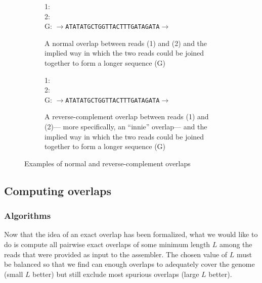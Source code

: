 \documentclass[12pt]{article}
\begin{document}
\begin{figure}
	\centering
	\begin{subfigure}[t]{0.455\textwidth}
		1:  \\
		2:  \\
		G: {\tt $\rightarrow$ATATATGCTGGTTACTTTGATAGATA$\rightarrow$}
		\caption{A normal overlap between reads (1) and (2) and the
		implied way in which the two reads could be joined together to
		form a longer sequence (G)}
	\end{subfigure}
		\hspace{0.07\textwidth}
	\begin{subfigure}[t]{0.455\textwidth}
		1:  \\
		2:  \\
		G: {\tt $\rightarrow$ATATATGCTGGTTACTTTGATAGATA$\rightarrow$}
		\caption{A reverse-complement overlap between reads (1) and
		(2)--- more specifically, an ``innie'' overlap--- and the
		implied way in which the two reads could be joined together to
		form a longer sequence (G)}
	\end{subfigure}
	\caption{Examples of normal and reverse-complement overlaps}
	\label{fig:overlap_examples}
\end{figure}

\subsection{Computing overlaps}

\subsubsection{Algorithms}

Now that the idea of an exact overlap has been formalized, what we would like to
do is compute all pairwise exact overlaps of some minimum length $L$ among the
	reads that were provided as input to the assembler.  The chosen value of $L$
	must be balanced so that we find can enough overlaps to adequately cover the
	genome (small $L$ better) but still exclude most spurious overlaps (large
	$L$ better).
\end{document}
